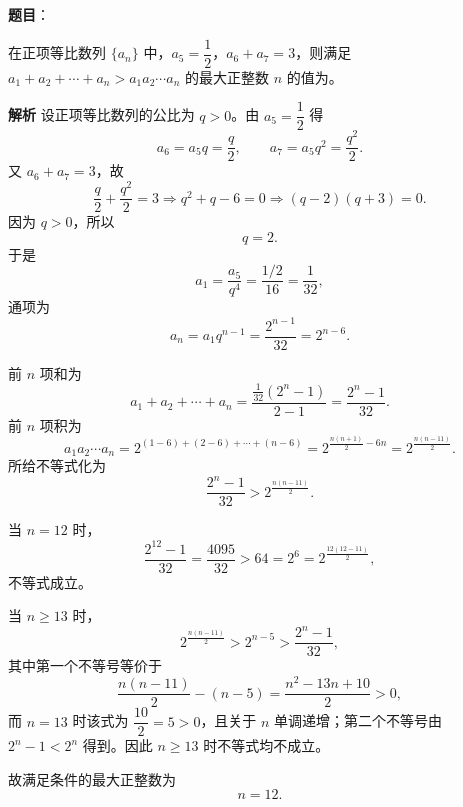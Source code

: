 \begin{answer}

\textbf{题目}：

在正项等比数列 $\{a_n\}$ 中，$a_5=\dfrac12$，$a_6+a_7=3$，则满足 $a_1+a_2+\cdots+a_n>a_1a_2\cdots a_n$ 的最大正整数 $n$ 的值为\gkblank{}。

\textbf{解析}
设正项等比数列的公比为 $q>0$。由 $a_5=\dfrac12$ 得
\nopagebreak[4]
\[a_6=a_5q=\frac q2,\qquad a_7=a_5q^2=\frac{q^2}{2}.\]
又 $a_6+a_7=3$，故
\nopagebreak[4]
\[\frac q2+\frac{q^2}{2}=3
\Longrightarrow q^2+q-6=0
\Longrightarrow (q-2)(q+3)=0.\]
因为 $q>0$，所以
\nopagebreak[4]
\[q=2.\]
于是
\nopagebreak[4]
\[a_1=\frac{a_5}{q^4}=\frac{1/2}{16}=\frac1{32},\]
通项为
\nopagebreak[4]
\[a_n=a_1q^{n-1}=\frac{2^{n-1}}{32}=2^{n-6}.\]

前 $n$ 项和为
\nopagebreak[4]
\[a_1+a_2+\cdots+a_n=\frac{\frac1{32}(2^n-1)}{2-1}=\frac{2^n-1}{32}.\]
前 $n$ 项积为
\nopagebreak[4]
\[a_1a_2\cdots a_n=2^{(1-6)+(2-6)+\cdots+(n-6)}
=2^{\frac{n(n+1)}2-6n}=2^{\frac{n(n-11)}2}.\]
所给不等式化为
\nopagebreak[4]
\[\frac{2^n-1}{32}>2^{\frac{n(n-11)}2}.\]

当 $n=12$ 时，
\nopagebreak[4]
\[\frac{2^{12}-1}{32}=\frac{4095}{32}>64=2^6=2^{\frac{12(12-11)}2},\]
不等式成立。

当 $n\geqslant13$ 时，
\nopagebreak[4]
\[2^{\frac{n(n-11)}2}>2^{n-5}>\frac{2^n-1}{32},\]
其中第一个不等号等价于
\nopagebreak[4]
\[\frac{n(n-11)}2-(n-5)=\frac{n^2-13n+10}{2}>0,\]
而 $n=13$ 时该式为 $\dfrac{10}{2}=5>0$，且关于 $n$ 单调递增；第二个不等号由 $2^n-1<2^n$ 得到。因此 $n\geqslant13$ 时不等式均不成立。

故满足条件的最大正整数为
\nopagebreak[4]
\[n=12.\]


\end{answer}
